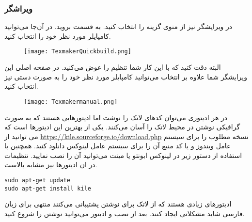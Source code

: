 \subsubsection{ ویراشگر }
در ویرایشگر  نیز از منوی  گزینه  را انتخاب کنید. به قسمت  بروید. در آن‌جا می‌توانید کامپایلر مورد نظر خود را انتخاب کنید.
\begin{figure}[h!]
 \centering\texttt{[image: TexmakerQuickbuild.png]}
 \end{figure}
البته دقت کنید که با این کار شما تنظیم  را عوض می‌کنید. در صفحه اصلی این ویرایشگر شما علاوه بر انتخاب  می‌توانید کامپایلر مورد نظر خود را به صورت دستی نیز انتخاب کنید.
\begin{figure}[h!]
 \centering\texttt{[image: Texmakermanual.png]}
 \end{figure}
 
در هر ادیتوری می‌توان کدهای لاتک را نوشت اما ادیتور‌هایی هستند که به صورت گرافیکی نوشتن در محیط لاتک را آسان می‌کنند. یکی از بهترین این ادیتورها 
 است که می توانید از 
\href{https://kile.sourceforge.io/download.php}{https://kile.sourceforge.io/download.php}
نسخه مطلوب را برای سیستم عامل ویندوز  و یا کد منبع آن را برای سیستم عامل لینوکس دانلود کنید. همچنین با استفاده از دستور زیر در لینوکس‌ ابونتو یا مینت می‌توانید آن را نصب نمایید. تنظیمات در ان ادیتور‌ها نیز مشابه بالاست.
\begin{latin}
\begin{lstlisting}[style=Mybash]
sudo apt-get update
sudo apt-get install kile
\end{lstlisting}
\end{latin}
ادیتور‌های زیادی هستند که از لاتک برای نوشتن پشتیبانی می‌کنند منتهی برای زبان فارسی شاید مشکلاتی ایجاد کنند.
بعد از نصب  و ادیتور می‌توانید نوشتن را شروع کنید.
